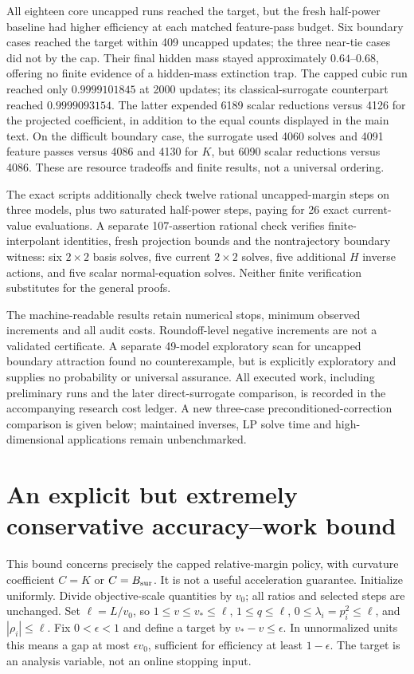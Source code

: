 \documentclass[11pt]{article}
\begin{document}
All eighteen core uncapped runs reached the target, but the fresh half-power baseline had higher efficiency at each matched feature-pass budget. Six boundary cases reached the target within 409 uncapped updates; the three near-tie cases did not by the cap. Their final hidden mass stayed approximately $0.64$--$0.68$, offering no finite evidence of a hidden-mass extinction trap. The capped cubic run reached only $0.9999101845$ at 2000 updates; its classical-surrogate counterpart reached $0.9999093154$. The latter expended 6189 scalar reductions versus 4126 for the projected coefficient, in addition to the equal counts displayed in the main text. On the difficult boundary case, the surrogate used 4060 solves and 4091 feature passes versus 4086 and 4130 for $K$, but 6090 scalar reductions versus 4086. These are resource tradeoffs and finite results, not a universal ordering.

The exact scripts additionally check twelve rational uncapped-margin steps on three models, plus two saturated half-power steps, paying for 26 exact current-value evaluations. A separate 107-assertion rational check verifies finite-interpolant identities, fresh projection bounds and the nontrajectory boundary witness: six $2\times2$ basis solves, five current $2\times2$ solves, five additional $H$ inverse actions, and five scalar normal-equation solves. Neither finite verification substitutes for the general proofs.

The machine-readable results retain numerical stops, minimum observed increments and all audit costs. Roundoff-level negative increments are not a validated certificate. A separate 49-model exploratory scan for uncapped boundary attraction found no counterexample, but is explicitly exploratory and supplies no probability or universal assurance. All executed work, including preliminary runs and the later direct-surrogate comparison, is recorded in the accompanying research cost ledger. A new three-case preconditioned-correction comparison is given below; maintained inverses, LP solve time and high-dimensional applications remain unbenchmarked.

\section{An explicit but extremely conservative accuracy--work bound}
This bound concerns precisely the capped relative-margin policy, with curvature coefficient $C=K$ or $C=B_{\rm sur}$. It is not a useful acceleration guarantee. Initialize uniformly. Divide objective-scale quantities by $v_0$; all ratios and selected steps are unchanged. Set $\ell=L/v_0$, so $1\le v\le v_*\le\ell$, $1\le q\le\ell$, $0\le\lambda_i=p_i^2\le\ell$, and $|\rho_i|\le\ell$. Fix $0<\epsilon<1$ and define a target by $v_*-v\le\epsilon$. In unnormalized units this means a gap at most $\epsilon v_0$, sufficient for efficiency at least $1-\epsilon$. The target is an analysis variable, not an online stopping input.
\end{document}
